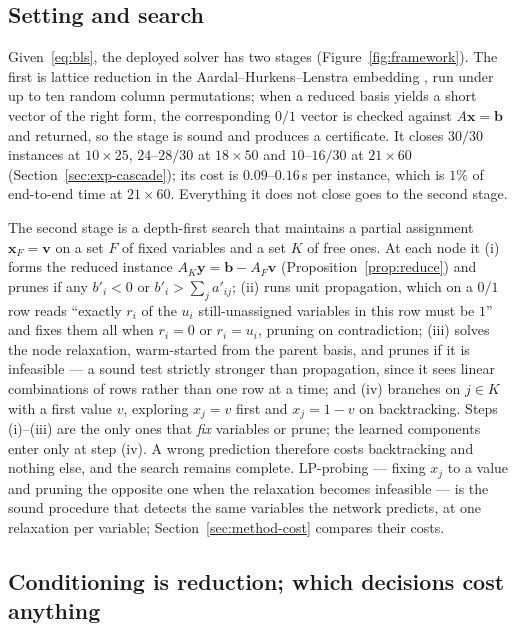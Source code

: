 \documentclass[final,5p,times,twocolumn]{elsarticle}
\begin{document}
\subsection{Setting and search}
\label{sec:method-setting}

Given~\eqref{eq:bls}, the deployed solver has two stages (Figure~\ref{fig:framework}). The first is lattice reduction in the Aardal--Hurkens--Lenstra embedding \citep{aardal2000diophantine}, run under up to ten random column permutations; when a reduced basis yields a short vector of the right form, the corresponding $0/1$ vector is checked against $A\mathbf{x}=\mathbf{b}$ and returned, so the stage is sound and produces a certificate. It closes $30/30$ instances at $10\times25$, $24$--$28/30$ at $18\times50$ and $10$--$16/30$ at $21\times60$ (Section~\ref{sec:exp-cascade}); its cost is $0.09$--$0.16$\,s per instance, which is $1\%$ of end-to-end time at $21\times60$. Everything it does not close goes to the second stage.

The second stage is a depth-first search that maintains a partial assignment $\mathbf{x}_F=\mathbf{v}$ on a set $F$ of fixed variables and a set $K$ of free ones. At each node it (i) forms the reduced instance $A_K\mathbf{y}=\mathbf{b}-A_F\mathbf{v}$ (Proposition~\ref{prop:reduce}) and prunes if any $b'_i<0$ or $b'_i>\sum_j a'_{ij}$; (ii) runs unit propagation, which on a $0/1$ row reads ``exactly $r_i$ of the $u_i$ still-unassigned variables in this row must be $1$'' and fixes them all when $r_i=0$ or $r_i=u_i$, pruning on contradiction; (iii) solves the node relaxation, warm-started from the parent basis, and prunes if it is infeasible --- a sound test strictly stronger than propagation, since it sees linear combinations of rows rather than one row at a time; and (iv) branches on $j\in K$ with a first value $v$, exploring $x_j=v$ first and $x_j=1-v$ on backtracking. Steps (i)--(iii) are the only ones that \emph{fix} variables or prune; the learned components enter only at step (iv). A wrong prediction therefore costs backtracking and nothing else, and the search remains complete. LP-probing --- fixing $x_j$ to a value and pruning the opposite one when the relaxation becomes infeasible --- is the sound procedure that detects the same variables the network predicts, at one relaxation per variable; Section~\ref{sec:method-cost} compares their costs.

\subsection{Conditioning is reduction; which decisions cost anything}
\label{sec:method-reduce}
\end{document}
